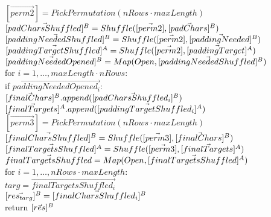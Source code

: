 \begin{protocol}
	\noindent
	$[\vec{perm2}] = PickPermutation(nRows \cdot maxLength) $\\
	$[\vec{padCharsShuffled}]^B = Shuffle([\vec{perm2}], [\vec{padChars}]^B) $ \\
	$[\vec{paddingNeededShuffled}]^B = Shuffle([\vec{perm2}], [\vec{paddingNeeded}]^B) $ \\
	$[\vec{paddingTargetShuffled}]^A = Shuffle([\vec{perm2}], [\vec{paddingTarget}]^A) $ \\

	\noindent
	$[\vec{paddingNeededOpened}]^B = Map(Open, [\vec{paddingNeededShuffled}]^B)$ \\
	for $i = 1, \ldots, maxLength \cdot nRows$: \\
	\indent if $\vec{paddingNeededOpened_{i}}$: \\
	\indent \indent $[\vec{finalChars}]^B.append([\vec{padCharsShuffled_i}]^B)$\\
	\indent \indent $[\vec{finalTargets}]^A.append([\vec{paddingTargetShuffled_i}]^A)$ \\

	\noindent 
	$[\vec{perm3}] = PickPermutation(nRows \cdot maxLength) $ \\
	$[\vec{finalCharsShuffled}]^B = Shuffle([\vec{perm3}], [\vec{finalChars}]^B) $ \\
	$[\vec{finalTargetsShuffled}]^A = Shuffle([\vec{perm3}], [\vec{finalTargets}]^A) $ \\
	$\vec{finalTargetsShuffled} = Map(Open, [\vec{finalTargetsShuffled}]^A) $ \\

	\noindent
	for $i = 1, \ldots, nRows \cdot maxLength $: \\
	\indent \indent $targ = \vec{finalTargetsShuffled_{i}}$ \\
	\indent \indent $[\vec{res_{targ}}]^B = [\vec{finalCharsShuffled_{i}}]^B$\\

	\noindent
	return $[\vec{res}]^B$

\end{protocol}
	
